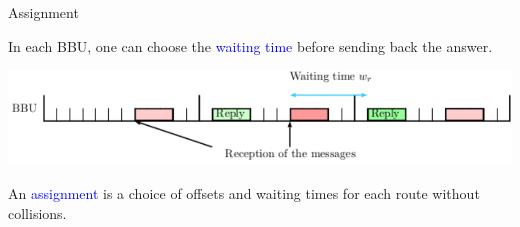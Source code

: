 \documentclass[10 pt]{beamer}
\begin{document}
\begin{frame}{Assignment}
\begin{center}
{\begin{tikzpicture}
\end{tikzpicture}
}
\end{center}


\pause

In each BBU, one can choose the \textcolor{blue}{waiting time} before sending back the answer.\\


\begin{center}
  \includegraphics[scale=0.7]{BBU}\\
 \end{center} 


\pause 

An \textcolor{blue}{assignment} is a choice of offsets and waiting times for each route without collisions.

   
\end{frame}
\end{document}
